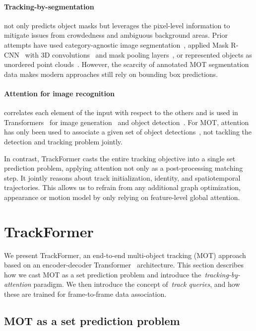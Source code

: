 \documentclass[10pt,twocolumn,letterpaper]{article}
\begin{document}
\paragraph{Tracking-by-segmentation} not only predicts object masks but leverages the pixel-level information to mitigate issues from crowdedness and ambiguous background areas.
Prior attempts have used category-agnostic image segmentation~\cite{Osep18ICRA}, applied Mask R-CNN~\cite{he2017mask} with 3D convolutions~\cite{MOTS} and mask pooling layers~\cite{MOTSNet}, or represented objects as unordered point clouds~\cite{pointtrack}.
However, the scarcity of annotated MOT segmentation data makes modern approaches still rely on bounding box predictions.

\paragraph{Attention for image recognition} correlates each element of the input with respect to the others and is used in Transformers~\cite{attention_is_all_you_need} for image generation~\cite{image_transformer} and object detection~\cite{DETR, deformable_detr}.
For MOT, attention has only been used to associate a given set of object detections~\cite{tracking_dual_matching, spatial_temporal_attention}, not tackling the detection and tracking problem jointly.

In contrast, TrackFormer casts the entire tracking objective into a single set prediction problem, applying attention not only as a post-processing matching step.
It jointly reasons about track initialization, identity, and spatiotemporal trajectories.
This allows us to refrain from any additional graph optimization, appearance or motion model by only relying on feature-level global attention.
 \section{TrackFormer}

We present TrackFormer, an end-to-end multi-object tracking (MOT) approach based on an encoder-decoder Transformer~\cite{attention_is_all_you_need} architecture.
This section describes how we cast MOT as a set prediction problem and introduce the~\textit{tracking-by-attention} paradigm. We then introduce the concept of~\textit{track queries}, and how these are trained for frame-to-frame data association.



\subsection{MOT as a set prediction problem}
\end{document}
